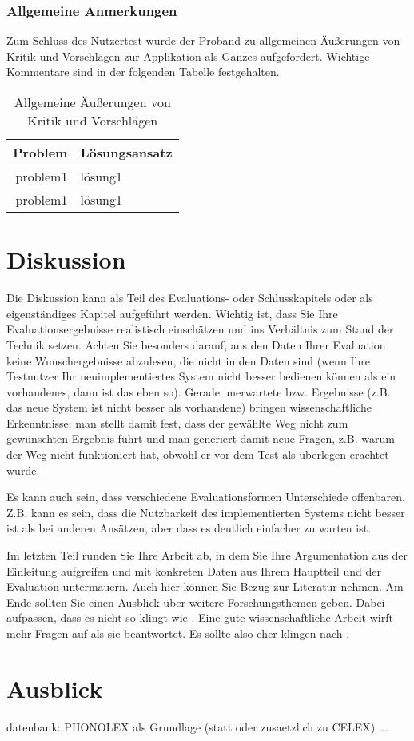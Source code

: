 \subsubsection{Allgemeine Anmerkungen}

Zum Schluss des Nutzertest wurde der Proband zu allgemeinen Äußerungen von Kritik und Vorschlägen zur Applikation als Ganzes aufgefordert. Wichtige Kommentare sind in der folgenden Tabelle festgehalten.

\begin{table}[h!]
	\centering
	\begin{tabular}{|r|l|}
		\hline
		\textbf{Problem} & \textbf{Lösungsansatz}\\
		\hline
		\hline
		problem1 & lösung1\\
		\hline
		problem1 & lösung1\\
		\hline
	\end{tabular}
	\caption{Allgemeine Äußerungen von Kritik und Vorschlägen}
	\label{table:usertestgeneral}
\end{table}


\section{Diskussion}
Die Diskussion kann als Teil des Evaluations- oder Schlusskapitels oder als eigenständiges Kapitel aufgeführt werden. Wichtig ist, dass Sie Ihre Evaluationsergebnisse realistisch einschätzen und ins Verhältnis zum Stand der Technik setzen. Achten Sie besonders darauf, aus den Daten Ihrer Evaluation keine Wunschergebnisse abzulesen, die nicht in den Daten sind (wenn Ihre Testnutzer Ihr neuimplementiertes System nicht besser bedienen können als ein vorhandenes, dann ist das eben so). Gerade unerwartete bzw.  Ergebnisse (z.B. das neue System ist nicht besser als vorhandene) bringen wissenschaftliche Erkenntnisse: man stellt damit fest, dass der gewählte Weg nicht zum gewünschten Ergebnis führt und man generiert damit neue Fragen, z.B. warum der Weg nicht funktioniert hat, obwohl er vor dem Test als überlegen erachtet wurde.

Es kann auch sein, dass verschiedene Evaluationsformen Unterschiede offenbaren. Z.B. kann es sein, dass die Nutzbarkeit des implementierten Systems nicht besser ist als bei anderen Ansätzen, aber dass es deutlich einfacher zu warten ist.


Im letzten Teil runden Sie Ihre Arbeit ab, in dem Sie Ihre Argumentation aus der Einleitung aufgreifen und mit konkreten Daten aus Ihrem Hauptteil und der Evaluation untermauern. Auch hier können Sie Bezug zur Literatur nehmen. Am Ende sollten Sie einen Ausblick über weitere Forschungsthemen geben. Dabei aufpassen, dass es nicht so klingt wie . Eine gute wissenschaftliche Arbeit wirft mehr Fragen auf als sie beantwortet. Es sollte also eher klingen nach .

\section{Ausblick}

datenbank: PHONOLEX als Grundlage (statt oder zusaetzlich zu CELEX)
...